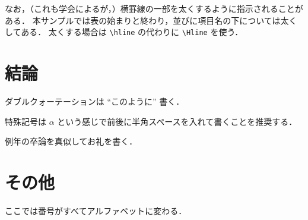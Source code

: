 \documentclass{thesis}
\begin{document}
なお，（これも学会によるが，）横罫線の一部を太くするように指示されることがある．
本サンプルでは表の始まりと終わり，並びに項目名の下については太くしてある．
太くする場合は \verb|\hline| の代わりに \verb|\Hline| を使う．


\chapter{結論}
\label{chap:結論}

ダブルクォーテーションは ``このように'' 書く．

特殊記号は $\alpha$ という感じで前後に半角スペースを入れて書くことを推奨する．


\acknowledgement

例年の卒論を真似してお礼を書く．




\appendix

\chapter{その他}

ここでは番号がすべてアルファベットに変わる．
\end{document}
